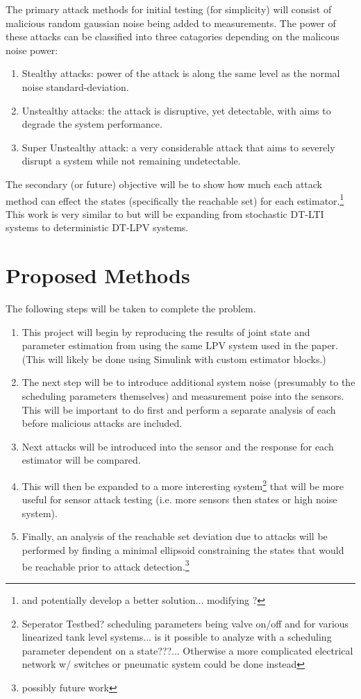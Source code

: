 \documentclass[]{article}
\begin{document}
The primary attack methods for initial testing (for simplicity) will consist of malicious random gaussian noise being added to measurements. The power of these attacks can be classified into three catagories depending on the malicous noise power:
\begin{enumerate}
	\item Stealthy attacks: power of the attack is along the same level as the normal noise standard-deviation.
	\item Unstealthy attacks: the attack is disruptive, yet detectable, with aims to degrade the system performance.
	\item Super Unstealthy attack: a very considerable attack that aims to severely disrupt a system while not remaining undetectable.
\end{enumerate}

The secondary (or future) objective will be to show how much each attack method can effect the states (specifically the reachable set) for each estimator.\footnote{and potentially develop a better solution... modifying \cite{securestateestimation}?} This work is very similar to \cite{hashemi2018comparison} but will be expanding from stochastic DT-LTI systems to deterministic DT-LPV systems.

\section{Proposed Methods}
The following steps will be taken to complete the problem.

\begin{enumerate}
	\item This project will begin by reproducing the results of joint state and parameter estimation from \cite{beelen2017joint} using the same LPV system used in the paper. (This will likely be done using Simulink with custom estimator blocks.)
	\item The next step will be to introduce additional system noise (presumably to the scheduling parameters themselves) and measurement poise into the sensors. This will be important to do first and perform a separate analysis of each before malicious attacks are included.
	\item Next attacks will be introduced into the sensor and the response for each estimator will be compared.
	\item This will then be expanded to a more interesting system\footnote{Seperator Testbed? scheduling parameters being valve on/off and for various linearized tank level systems... is it possible to analyze with a scheduling parameter dependent on a state???... Otherwise a more complicated electrical network w/ switches or pneumatic system could be done instead} that will be more useful for sensor attack testing (i.e. more sensors then states or high noise system).
	\item Finally, an analysis of the reachable set deviation due to attacks will be performed by finding a minimal ellipsoid constraining the states that would be reachable prior to attack detection.\footnote{possibly future work}
\end{enumerate}

\newpage


\end{document}
